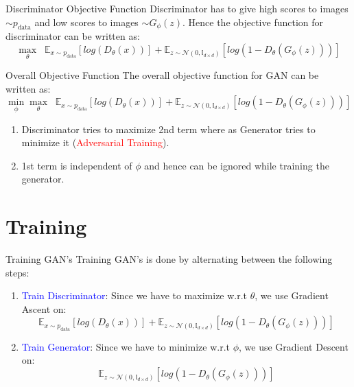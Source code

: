 \begin{frame}{Discriminator Objective Function}
    Discriminator has to give high scores to images $\sim p_{\text{data}}$ and low scores to images $\sim G_{\phi}(z)$. Hence the objective function for discriminator can be written as: \\
    \begin{equation}
        \max_{\theta} \;\; \mathbb{E}_{x \sim p_{\text{data}}} \left[ log(D_{\theta}(x)) \right] + \mathbb{E}_{z \sim \mathcal{N}(0,\mathbb{I}_{d \times d})} \left[ log(1 - D_{\theta}(G_{\phi}(z))) \right]
    \end{equation}
\end{frame}

\begin{frame}{Overall Objective Function}
    The overall objective function for GAN can be written as:
    \begin{equation}
        \min_{\phi} \max_{\theta} \;\; \mathbb{E}_{x \sim p_{\text{data}}} \left[ log(D_{\theta}(x)) \right] + \mathbb{E}_{z \sim \mathcal{N}(0,\mathbb{I}_{d \times d})} \left[ log(1 - D_{\theta}(G_{\phi}(z))) \right]
    \end{equation}
    
    \begin{enumerate}
        \item Discriminator tries to maximize 2nd term where as Generator tries to minimize it (\textcolor{red}{Adversarial Training}).
        \item 1st term is independent of $\phi$ and hence can be ignored while training the generator.
    \end{enumerate}
\end{frame}

\section*{Training}
\begin{frame}{Training GAN's}
    Training GAN's is done by alternating between the following steps:
    \begin{enumerate}
        \item \textcolor{blue}{Train Discriminator}: Since we have to maximize w.r.t $\theta$, we use Gradient Ascent on:
        \begin{equation}
            \mathbb{E}_{x \sim p_{\text{data}}} \left[ log(D_{\theta}(x)) \right] + \mathbb{E}_{z \sim \mathcal{N}(0,\mathbb{I}_{d \times d})} \left[ log(1 - D_{\theta}(G_{\phi}(z))) \right]
        \end{equation}

        \item \textcolor{blue}{Train Generator}: Since we have to minimize w.r.t $\phi$, we use Gradient Descent on:
        \begin{equation}
            \mathbb{E}_{z \sim \mathcal{N}(0,\mathbb{I}_{d \times d})} \left[ log(1 - D_{\theta}(G_{\phi}(z))) \right]
        \end{equation}
    \end{enumerate}
\end{frame}

